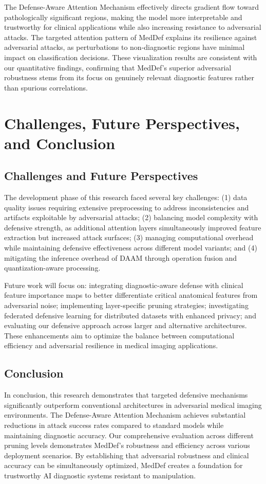 \documentclass[preprint,12pt]{elsarticle}
\begin{document}
The Defense-Aware Attention Mechanism effectively directs gradient flow toward pathologically significant regions, making the model more interpretable and trustworthy for clinical applications while also increasing resistance to adversarial attacks. The targeted attention pattern of MedDef explains its resilience against adversarial attacks, as perturbations to non-diagnostic regions have minimal impact on classification decisions. These visualization results are consistent with our quantitative findings, confirming that MedDef's superior adversarial robustness stems from its focus on genuinely relevant diagnostic features rather than spurious correlations.

\section{Challenges, Future Perspectives, and Conclusion}
\label{sec:challenges}

\subsection{Challenges and Future Perspectives}
The development phase of this research faced several key challenges: (1) data quality issues requiring extensive preprocessing to address inconsistencies and artifacts exploitable by adversarial attacks; (2) balancing model complexity with defensive strength, as additional attention layers simultaneously improved feature extraction but increased attack surfaces; (3) managing computational overhead while maintaining defensive effectiveness across different model variants; and (4) mitigating the inference overhead of DAAM through operation fusion and quantization-aware processing.

Future work will focus on: integrating diagnostic-aware defense with clinical feature importance maps to better differentiate critical anatomical features from adversarial noise; implementing layer-specific pruning strategies; investigating federated defensive learning for distributed datasets with enhanced privacy; and evaluating our defensive approach across larger and alternative architectures. These enhancements aim to optimize the balance between computational efficiency and adversarial resilience in medical imaging applications.

\subsection{Conclusion}
In conclusion, this research demonstrates that targeted defensive mechanisms significantly outperform conventional architectures in adversarial medical imaging environments. The Defense-Aware Attention Mechanism achieves substantial reductions in attack success rates compared to standard models while maintaining diagnostic accuracy. Our comprehensive evaluation across different pruning levels demonstrates MedDef's robustness and efficiency across various deployment scenarios. By establishing that adversarial robustness and clinical accuracy can be simultaneously optimized, MedDef creates a foundation for trustworthy AI diagnostic systems resistant to manipulation.
\end{document}
